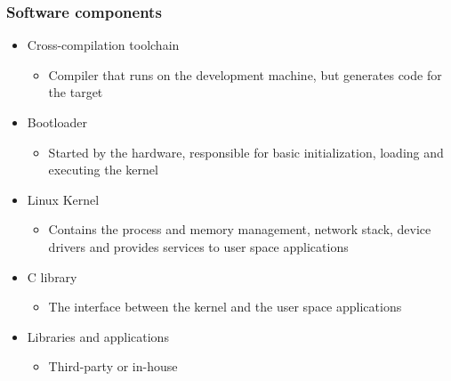 \begin{frame}
  \frametitle{Software components}
  \begin{itemize}
  \item Cross-compilation toolchain
    \begin{itemize}
    \item Compiler that runs on the development machine, but generates
      code for the target
    \end{itemize}
  \item Bootloader
    \begin{itemize}
    \item Started by the hardware, responsible for basic
      initialization, loading and executing the kernel
    \end{itemize}
  \item Linux Kernel
    \begin{itemize}
    \item Contains the process and memory management, network stack,
      device drivers and provides services to user space applications
    \end{itemize}
  \item C library
    \begin{itemize}
    \item The interface between the kernel and the user space
      applications
    \end{itemize}
  \item Libraries and applications
    \begin{itemize}
    \item Third-party or in-house
    \end{itemize}
  \end{itemize}
\end{frame}

